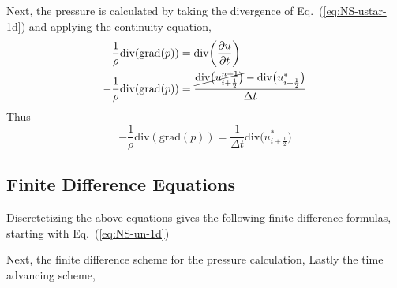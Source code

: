 \documentclass[12pt]{article}
\begin{document}
Next, the pressure is calculated by taking the divergence of
Eq.~(\ref{eq:NS-ustar-1d}) and applying the continuity equation,  
\begin{subequations}
    \begin{align}
        -\frac{1}{\rho} \text{div}(\text{grad}(p)) & =
                \text{div}\bigg(\pdv{u}{t}\bigg)        \\
        -\frac{1}{\rho} \text{div}(\text{grad}(p)) & =
            \frac{
                    \cancel{\text{div}\big(u^{n+1}_{i+\frac{1}{2}}\big)} -
                    \text{div}\big(u^{\ast}_{i+\frac{1}{2}}\big)
                }
                {\Delta t}
    \end{align}
\end{subequations}
Thus
\begin{equation}
    -\frac{1}{\rho} \text{div}(\text{grad}(p)) =
        \frac{1}{\Delta t} \text{div} \big(u^{\ast}_{i+\frac{1}{2}}\big)
\end{equation}
\newpage
\subsection{Finite Difference Equations}
Discretetizing the above equations gives the following finite difference
formulas, starting with Eq.~(\ref{eq:NS-un-1d})

Next, the finite difference scheme for the pressure calculation,
Lastly the time advancing scheme,
        
\end{document}
